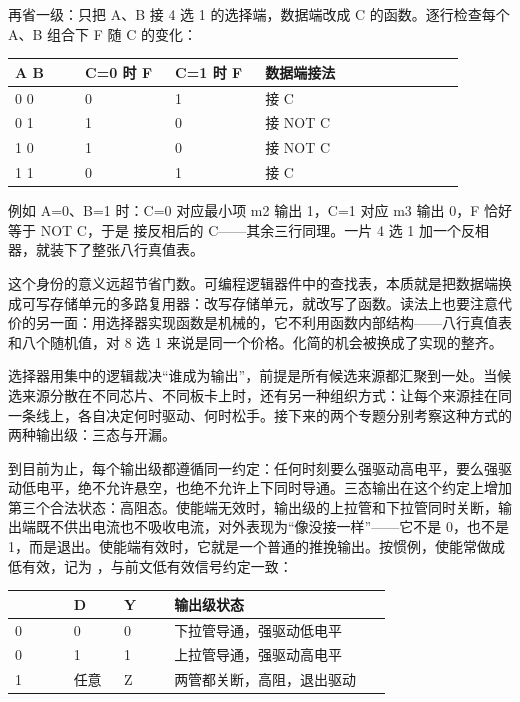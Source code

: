 再省一级：只把 A、B 接 4 选 1 的选择端，数据端改成 C 的函数。逐行检查每个 A、B 组合下 F 随 C 的变化：

\begin{longtable}{L{0.14\linewidth}L{0.18\linewidth}L{0.18\linewidth}L{0.4\linewidth}}
\toprule
A B & C=0 时 F & C=1 时 F & 数据端接法 \\
 0 & 0 & 1 &  接 C \\
0 1 & 1 & 0 &  接 NOT C \\
1 0 & 1 & 0 &  接 NOT C \\
1 1 & 0 & 1 &  接 C \\
\bottomrule
\end{longtable}

例如 A=0、B=1 时：C=0 对应最小项 m2 输出 1，C=1 对应 m3 输出 0，F 恰好等于 NOT C，于是  接反相后的 C——其余三行同理。一片 4 选 1 加一个反相器，就装下了整张八行真值表。

这个身份的意义远超节省门数。可编程逻辑器件中的查找表，本质就是把数据端换成可写存储单元的多路复用器：改写存储单元，就改写了函数。读法上也要注意代价的另一面：用选择器实现函数是机械的，它不利用函数内部结构——八行真值表和八个随机值，对 8 选 1 来说是同一个价格。化简的机会被换成了实现的整齐。

选择器用集中的逻辑裁决“谁成为输出”，前提是所有候选来源都汇聚到一处。当候选来源分散在不同芯片、不同板卡上时，还有另一种组织方式：让每个来源挂在同一条线上，各自决定何时驱动、何时松手。接下来的两个专题分别考察这种方式的两种输出级：三态与开漏。

到目前为止，每个输出级都遵循同一约定：任何时刻要么强驱动高电平，要么强驱动低电平，绝不允许悬空，也绝不允许上下同时导通。三态输出在这个约定上增加第三个合法状态：高阻态。使能端无效时，输出级的上拉管和下拉管同时关断，输出端既不供出电流也不吸收电流，对外表现为“像没接一样”——它不是 0，也不是 1，而是退出。使能端有效时，它就是一个普通的推挽输出。按惯例，使能常做成低有效，记为 ，与前文低有效信号约定一致：

\begin{longtable}{L{0.14\linewidth}L{0.12\linewidth}L{0.12\linewidth}L{0.52\linewidth}}
\toprule
{} & D & Y & 输出级状态 \\
 & 0 & 0 & 下拉管导通，强驱动低电平 \\
0 & 1 & 1 & 上拉管导通，强驱动高电平 \\
1 & 任意 & Z & 两管都关断，高阻，退出驱动 \\
\bottomrule
\end{longtable}

